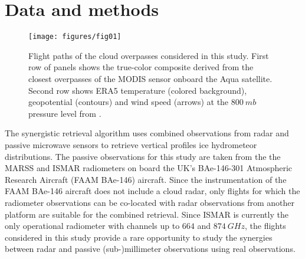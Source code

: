 \documentclass[journal abbreviation, manuscript]{copernicus}
\begin{document}
\section{Data and methods}
\label{sec:methods_and_data}

\begin{figure}[h!]
  \centering \texttt{[image: figures/fig01]}
  \caption{Flight paths of the cloud overpasses considered in this study. First
    row of panels shows the true-color composite derived from the closest
    overpasses of the MODIS \citep{modis} sensor onboard the Aqua satellite.
    Second row shows ERA5 temperature (colored background),
    geopotential (contours) and wind speed (arrows) at the $800\ \unit{mb}$
    pressure level from \citet{era5}.}
  \label{fig:flight_overview}
\end{figure}

The synergistic retrieval algorithm uses combined observations from radar and
passive microwave sensors to retrieve vertical profiles ice hydrometeor
distributions. The passive observations for this study are taken from the the
MARSS \citep{mcgrath01} and ISMAR \citep{fox17} radiometers on board the UK’s
BAe-146-301 Atmospheric Research Aircraft (FAAM BAe-146) aircraft. Since the
instrumentation of the FAAM BAe-146 aircraft does not include a cloud radar,
only flights for which the radiometer observations can be co-located with radar
observations from another platform are suitable for the combined retrieval.
Since ISMAR is currently the only operational radiometer with channels up to
$664$ and $874\ \unit{GHz}$, the flights considered in this study provide a rare
opportunity to study the synergies between radar and passive (sub-)millimeter
observations using real observations.
\end{document}
